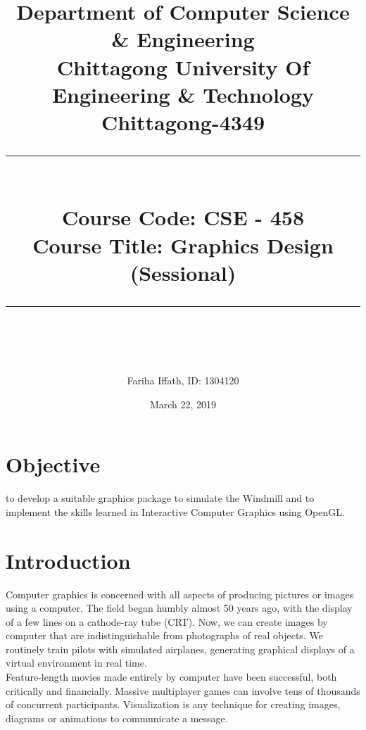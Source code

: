\documentclass[fontsize=12pt]{article}
\begin{document}

\title{Department of Computer Science \&  Engineering \\ Chittagong University Of Engineering \& Technology \\ Chittagong-4349\\ 
	\noindent\rule{13cm}{0.4pt}\\
	 Course Code: CSE - 458\\Course Title: Graphics Design (Sessional)\\
	\noindent\rule{13cm}{0.4pt}\\
}


\author {
	Fariha Iffath, ID: 1304120\\	
}
\date{March 22, 2019}

\maketitle
\newpage


\section{Objective} %

to develop a suitable graphics package to simulate the Windmill and to implement the skills learned in Interactive Computer Graphics  using OpenGL.

\section{Introduction}

Computer graphics is concerned with all aspects of producing pictures or images using a computer. The field began humbly almost 50 years ago, with the display of a few lines on a cathode-ray tube (CRT). Now, we can create images by computer that are indistinguishable from photographs of real objects. We routinely train pilots with simulated airplanes, generating graphical displays of a virtual environment in real time\cite{R:1}.\\
Feature-length movies made entirely by computer have been successful, both critically and financially. Massive multiplayer games can involve tens of thousands of concurrent participants. Visualization is any technique for creating images, diagrams or animations to communicate a message\cite{R:2}.
\end{document}
